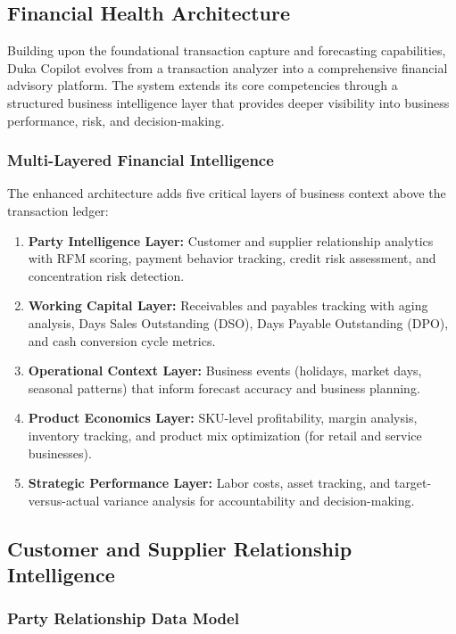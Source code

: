 \documentclass[10pt,a4paper]{article}
\begin{document}
\subsection{Financial Health Architecture}

Building upon the foundational transaction capture and forecasting capabilities, Duka Copilot evolves from a transaction analyzer into a comprehensive financial advisory platform. The system extends its core competencies through a structured business intelligence layer that provides deeper visibility into business performance, risk, and decision-making.

\subsubsection{Multi-Layered Financial Intelligence}

The enhanced architecture adds five critical layers of business context above the transaction ledger:

\begin{enumerate}[label=\textbf{Layer \arabic*.}]
  \item \textbf{Party Intelligence Layer:} Customer and supplier relationship analytics with RFM scoring, payment behavior tracking, credit risk assessment, and concentration risk detection.
  \item \textbf{Working Capital Layer:} Receivables and payables tracking with aging analysis, Days Sales Outstanding (DSO), Days Payable Outstanding (DPO), and cash conversion cycle metrics.
  \item \textbf{Operational Context Layer:} Business events (holidays, market days, seasonal patterns) that inform forecast accuracy and business planning.
  \item \textbf{Product Economics Layer:} SKU-level profitability, margin analysis, inventory tracking, and product mix optimization (for retail and service businesses).
  \item \textbf{Strategic Performance Layer:} Labor costs, asset tracking, and target-versus-actual variance analysis for accountability and decision-making.
\end{enumerate}

\subsection{Customer and Supplier Relationship Intelligence}

\subsubsection{Party Relationship Data Model}
\end{document}
